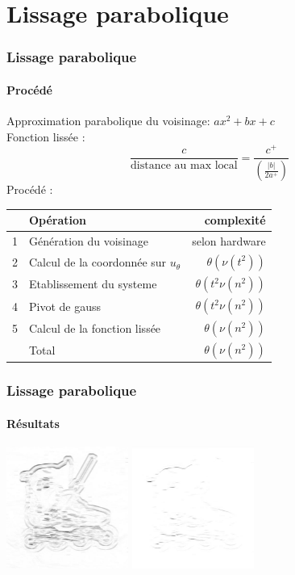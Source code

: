 \documentclass[french]{beamer}
\begin{document}
\section{Lissage parabolique}

\begin{frame}
	\frametitle{Lissage parabolique}
	\framesubtitle{Procédé}
	Approximation parabolique du voisinage: $ax^2 + bx + c$ \\
	Fonction lissée : $$\frac{c}{\text{distance au max local}} = \frac{c^+}{\left(\frac{|b|}{2a^+}\right)}$$
	Procédé : \\
	\smallskip
	\begin{tabular}{|c|l|r|}
		\hline
		& Opération & complexité \\ \hline
		1 & Génération du voisinage & selon hardware \\ \hline
		2 & Calcul de la coordonnée sur $u_\theta$ & $\theta(\nu(t^2))$ \\ \hline
		3 & Etablissement du systeme & $\theta(t^2 \nu(n^2))$ \\ \hline
		4 & Pivot de gauss & $\theta(t^2 \nu(n^2))$ \\ \hline
		5 & Calcul de la fonction lissée & $\theta(\nu(n^2))$ \\ \hline
		& Total & $\theta(\nu(n^2))$ \\
		\hline
	\end{tabular}
\end{frame}

\begin{frame}
	\frametitle{Lissage parabolique}
	\framesubtitle{Résultats}
	\includegraphics[width=4cm]{images/roller_filteredn.jpg} \; \includegraphics[width=4cm]{images/roller_localisedn.jpg}
\end{frame}
\end{document}
